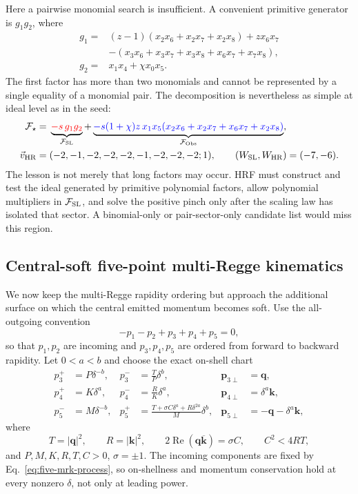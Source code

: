 \documentclass[a4paper,11pt]{article}
\newcommand{\FSL}{\mathcal F_{\rm SL}}
\newcommand{\FObs}{\mathcal F_{\rm Obs}}
\newcommand{\WSL}{W_{\rm SL}}
\newcommand{\WHR}{W_{\rm HR}}
\newcommand{\vHR}{\vec v_{\rm HR}}
\newcommand{\SLcolour}[1]{{\color{red}#1}}
\newcommand{\HRcolour}[1]{{\color{blue}#1}}
\begin{document}
Here a pairwise monomial search is insufficient.  A convenient primitive
generator is \(g_1g_2\), where
\begin{align}
 g_1={}&(z-1)(x_2x_6+x_2x_7+x_2x_8)+zx_6x_7
 \nonumber\\[-1mm]
 &-(x_3x_6+x_3x_7+x_3x_8+x_6x_7+x_7x_8),
 \nonumber\\
 g_2={}&x_1x_4+\chi x_0x_5.
 \label{eq:five-vertex-factors}
\end{align}
The first factor has more than two monomials and cannot be represented by a
single equality of a monomial pair.  The decomposition is nevertheless as
simple at ideal level as in the seed:
\begin{align}
 \mathcal F_\star={}&
 \underbrace{\SLcolour{-s\,g_1g_2}}_{\FSL}
 +\underbrace{\HRcolour{-s(1+\chi)z\,x_1x_5
 (x_2x_6+x_2x_7+x_6x_7+x_2x_8)}}_{\FObs},
 \label{eq:five-vertex-decomposition}\\
 \vHR={}&(-2,-1,-2,-2,-2,-1,-2,-2,-2;1),
 \qquad (\WSL,\WHR)=(-7,-6).
 \label{eq:five-vertex-vector}
\end{align}
The lesson is not merely that long factors may occur.  HRF must construct
and test the ideal generated by primitive polynomial factors, allow
polynomial multipliers in \(\FSL\), and solve the positive pinch only after
the scaling law has isolated that sector.  A binomial-only or
pair-sector-only candidate list would miss this region.

\subsection{Central-soft five-point multi-Regge kinematics}
\label{sec:five-point-central-soft-mrk}

We now keep the multi-Regge rapidity ordering but approach the additional
surface on which the central emitted momentum becomes soft.  Use the
all-outgoing convention
\begin{equation}
 -p_1-p_2+p_3+p_4+p_5=0,
 \label{eq:five-mrk-process}
\end{equation}
so that \(p_1,p_2\) are incoming and \(p_3,p_4,p_5\) are ordered from forward
to backward rapidity.  Let \(0<a<b\) and choose the exact on-shell chart
\begin{align}
 p_3^+&=P\delta^{-b},&
 p_3^-&=\frac{T}{P}\delta^b,&
 \boldsymbol p_{3\perp}&=\boldsymbol q,
 \nonumber\\
 p_4^+&=K\delta^a,&
 p_4^-&=\frac{R}{K}\delta^a,&
 \boldsymbol p_{4\perp}&=\delta^a\boldsymbol k,
 \nonumber\\
 p_5^-&=M\delta^{-b},&
 p_5^+&=\frac{T+\sigma C\delta^a+R\delta^{2a}}{M}\delta^b,&
 \boldsymbol p_{5\perp}&=-\boldsymbol q-\delta^a\boldsymbol k,
 \label{eq:five-mrk-chart}
\end{align}
where
\begin{equation}
 T=|\boldsymbol q|^2,\qquad R=|\boldsymbol k|^2,\qquad
 2\operatorname{Re}(\boldsymbol q\overline{\boldsymbol k})=\sigma C,
 \qquad C^2<4RT,
 \label{eq:five-mrk-domain}
\end{equation}
and \(P,M,K,R,T,C>0\), \(\sigma=\pm1\).  The incoming components are fixed by
Eq.~\eqref{eq:five-mrk-process}, so on-shellness and momentum conservation
hold at every nonzero \(\delta\), not only at leading power.
\end{document}
